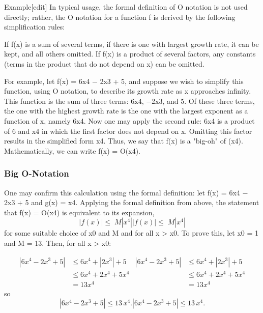 \documentclass{beamer}
\begin{document}
\begin{frame}
Example[edit]
In typical usage, the formal definition of O notation is not used directly; rather, the O notation for a function f is derived by the following simplification rules:

If f(x) is a sum of several terms, if there is one with largest growth rate, it can be kept, and all others omitted.
If f(x) is a product of several factors, any constants (terms in the product that do not depend on x) can be omitted.
\end{frame}
\begin{frame}
For example, let f(x) = 6x4 − 2x3 + 5, and suppose we wish to simplify this function, using O notation, to describe its growth rate as x approaches infinity. This function is the sum of three terms: 6x4, −2x3, and 5. Of these three terms, the one with the highest growth rate is the one with the largest exponent as a function of x, namely 6x4. Now one may apply the second rule: 6x4 is a product of 6 and x4 in which the first factor does not depend on x. Omitting this factor results in the simplified form x4. Thus, we say that f(x) is a "big-oh" of (x4). Mathematically, we can write f(x) = O(x4). 
\end{frame}
\begin{frame}
\frametitle{Big O-Notation}
One may confirm this calculation using the formal definition: let f(x) = 6x4 − 2x3 + 5 and g(x) = x4. Applying the formal definition from above, the statement that f(x) = O(x4) is equivalent to its expansion,
\[
{\displaystyle |f(x)|\leq \;M|x^{4}|} {\displaystyle |f(x)|\leq \;M|x^{4}|}\]
for some suitable choice of x0 and M and for all x > x0. To prove this, let x0 = 1 and M = 13. Then, for all x > x0:

\[{\displaystyle {\begin{aligned}|6x^{4}-2x^{3}+5|&\leq 6x^{4}+|2x^{3}|+5\\&\leq 6x^{4}+2x^{4}+5x^{4}\\&=13x^{4}\end{aligned}}} {\displaystyle {\begin{aligned}|6x^{4}-2x^{3}+5|&\leq 6x^{4}+|2x^{3}|+5\\&\leq 6x^{4}+2x^{4}+5x^{4}\\&=13x^{4}\end{aligned}}}\]
so
\[
{\displaystyle |6x^{4}-2x^{3}+5|\leq 13\,x^{4}.} |6x^{4}-2x^{3}+5|\leq 13\,x^{4}.
\]
\end{frame}
\end{document}
